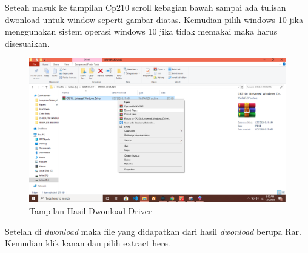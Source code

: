\par Seteah masuk ke tampilan Cp210 scroll kebagian bawah sampai ada tulisan dwonload untuk window seperti gambar diatas. Kemudian pilih windows 10 jika menggunakan sistem operasi windows 10 jika tidak memakai maka harus disesuaikan.
\begin{figure}[H]
\centering
\includegraphics[width=1\textwidth]{figures/google5.png}
\caption{Tampilan Hasil Dwonload Driver }
\label{print}
\end{figure}
\par Setelah di \textit{dwonload} maka file yang didapatkan dari hasil \textit{dwonload} berupa Rar. Kemudian klik kanan dan pilih extract here.

